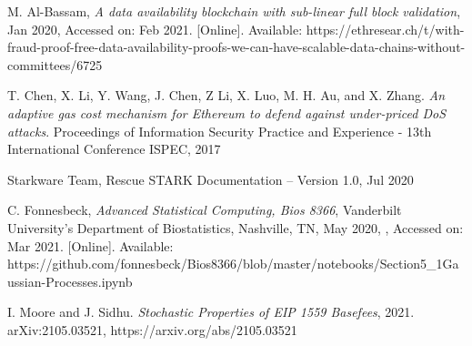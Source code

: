 \documentclass[peerreview]{ieeesyscoin}
\begin{document}
\begin{thebibliography}{00}
 M. Al-Bassam,\textit{ A data availability blockchain with sub-linear full block validation}, Jan 2020, Accessed on: Feb 2021.  [Online]. Available:  https://ethresear.ch/t/with-fraud-proof-free-data-availability-proofs-we-can-have-scalable-data-chains-without-committees/6725

  T. Chen, X. Li, Y. Wang, J. Chen, Z Li, X. Luo, M. H. Au, and X. Zhang. \textit{An adaptive gas cost mechanism for Ethereum to defend against under-priced DoS attacks}. Proceedings of Information Security Practice and Experience - 13th International Conference ISPEC, 2017

  Starkware Team, Rescue STARK Documentation – Version 1.0, Jul 2020

 C. Fonnesbeck, \textit{Advanced Statistical Computing, Bios 8366}, Vanderbilt University's Department of Biostatistics, Nashville, TN, May 2020, , Accessed on: Mar 2021.  [Online]. Available:  https://github.com/fonnesbeck/Bios8366/blob/master/notebooks/Section5\_1\-Gaussian-Processes.ipynb

  I. Moore and J. Sidhu. \textit{Stochastic Properties of EIP 1559 Basefees}, 2021. arXiv:2105.03521,  https://arxiv.org/abs/2105.03521



\end{thebibliography}


\EOD
\end{document}
